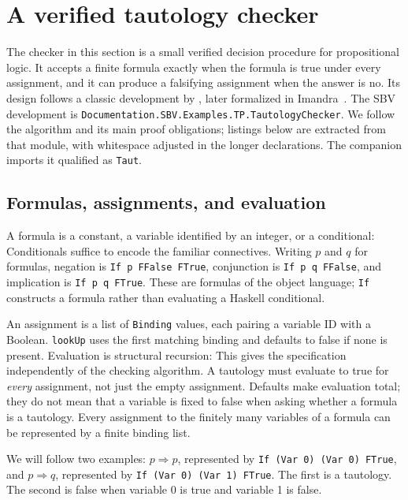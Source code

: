 \documentclass[review]{jfp-epi}
\newcommand{\code}[1]{\texttt{#1}}
\begin{document}
\section{A verified tautology checker}
\label{sec:tautology}

The checker in this section is a small verified decision procedure for
propositional logic. It accepts a finite formula exactly when the formula is
true under every assignment, and it can produce a falsifying assignment when
the answer is no. Its design follows a classic development by
\citet[Chapter~4]{boyermoore}, later formalized in Imandra~\citep{imandraTautology}.
The SBV development is
\code{Documentation.\allowbreak SBV.\allowbreak Examples.\allowbreak TP.\allowbreak TautologyChecker}.
We follow the algorithm and its main proof obligations; listings below are
extracted from that module, with whitespace adjusted in the longer declarations.
The companion imports it qualified as \code{Taut}.

\subsection{Formulas, assignments, and evaluation}

A formula is a constant, a variable identified by an integer, or a conditional:
Conditionals suffice to encode the familiar connectives. Writing $p$ and $q$
for formulas, negation is \code{If p FFalse FTrue}, conjunction is
\code{If p q FFalse}, and implication is \code{If p q FTrue}. These are formulas
of the object language; \code{If} constructs a formula rather than evaluating
a Haskell conditional.

An assignment is a list of \code{Binding} values, each pairing a variable ID
with a Boolean. \code{lookUp} uses the first matching binding and defaults to
false if none is present. Evaluation is structural recursion:
This gives the specification independently of the checking algorithm. A tautology
must evaluate to true for \emph{every} assignment, not just the empty assignment.
Defaults make evaluation total; they do not mean that a variable is fixed to
false when asking whether a formula is a tautology. Every assignment to the
finitely many variables of a formula can be represented by a finite binding list.

We will follow two examples: $p\Rightarrow p$, represented by
\code{If (Var 0) (Var 0) FTrue}, and $p\Rightarrow q$, represented by
\code{If (Var 0) (Var 1) FTrue}. The first is a tautology. The second is false
when variable 0 is true and variable 1 is false.
\end{document}
